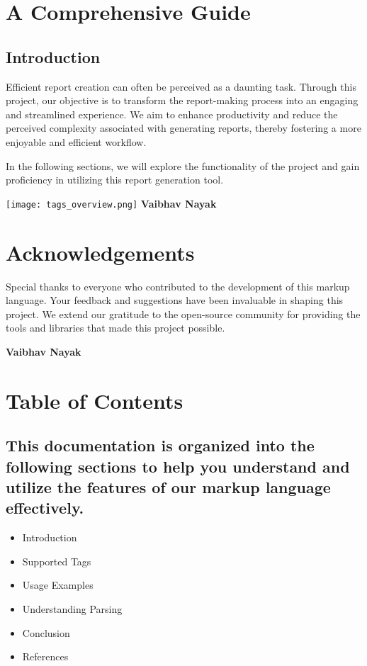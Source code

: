 \documentclass[oneside]{memoir}
\begin{document}
\setcounter{page}{0}
\tableofcontents

\clearpage
{}
\setcounter{page}{1}
\newpage
\chapter{A Comprehensive Guide}
\section{Introduction}
Efficient report creation can often be perceived as a daunting task. Through this project, our objective is to transform the report-making process into an engaging and streamlined experience. We aim to enhance productivity and reduce the perceived complexity associated with generating reports, thereby fostering a more enjoyable and efficient workflow.\par
In the following sections, we will explore the functionality of the project and gain proficiency in utilizing this report generation tool.\par
\texttt{[image: tags\_overview.png]}
\hfill \textbf{Vaibhav Nayak}
\date{2024-06-14}

\newpage
\chapter{Acknowledgements}
Special thanks to everyone who contributed to the development of this markup language. Your feedback and suggestions have been invaluable in shaping this project. We extend our gratitude to the open-source community for providing the tools and libraries that made this project possible.\par
\hfill \textbf{Vaibhav Nayak}
\date{2024-06-14}

\newpage
\chapter{Table of Contents}
\section{This documentation is organized into the following sections to help you understand and utilize the features of our markup language effectively.}
\begin{itemize}
\item Introduction
\item Supported Tags
\item Usage Examples
\item Understanding Parsing
\item Conclusion
\item References
\end{itemize}
\end{document}

